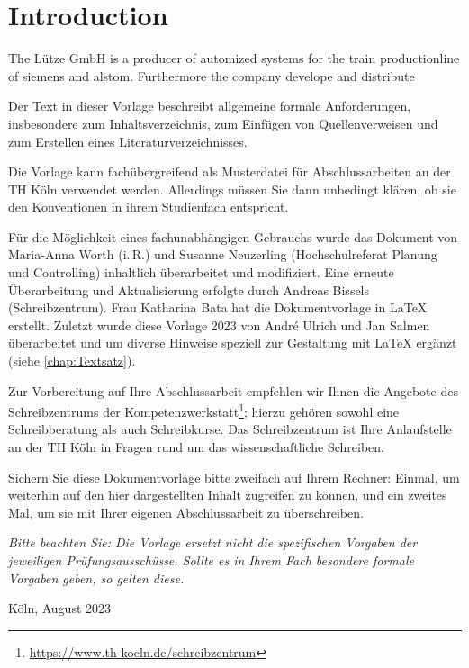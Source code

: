 \chapter{Introduction}
%
The Lütze GmbH is a producer of automized systems for the train productionline of siemens and alstom. Furthermore the company develope and distribute   
\par
Der Text in dieser Vorlage beschreibt allgemeine formale Anforderungen, insbesondere zum Inhaltsverzeichnis, zum Einfügen von Quellenverweisen und zum Erstellen eines Literaturverzeichnisses.
\par
Die Vorlage kann fachübergreifend als Musterdatei für Abschlussarbeiten an der TH Köln verwendet werden. Allerdings müssen Sie dann unbedingt klären, ob sie den Konventionen in ihrem Studienfach entspricht.
\par
Für die Möglichkeit eines fachunabhängigen Gebrauchs wurde das Dokument von Maria-Anna Worth (i.\,R.) und Susanne Neuzerling (Hochschulreferat Planung und Controlling) inhaltlich überarbeitet und modifiziert. Eine erneute Überarbeitung und Aktualisierung erfolgte durch Andreas Bissels (Schreibzentrum). Frau Katharina Bata hat die Dokumentvorlage in LaTeX erstellt. Zuletzt wurde diese Vorlage 2023 von André Ulrich und Jan Salmen überarbeitet und um diverse Hinweise speziell zur Gestaltung mit \LaTeX{} ergänzt (siehe \cref{chap:Textsatz}).
\par
Zur Vorbereitung auf Ihre Abschlussarbeit empfehlen wir Ihnen die Angebote des Schreibzentrums der Kompetenzwerkstatt\footnote{\href{https://www.th-koeln.de/schreibzentrum}{https://www.th-koeln.de/schreibzentrum}}; hierzu gehören sowohl eine Schreibberatung als auch Schreibkurse. Das Schreibzentrum ist Ihre Anlaufstelle an der TH Köln in Fragen rund um das wissenschaftliche Schreiben.
\par
Sichern Sie diese Dokumentvorlage bitte zweifach auf Ihrem Rechner: Einmal, um weiterhin auf den hier dargestellten Inhalt zugreifen zu können, und ein zweites Mal, um sie mit Ihrer eigenen Abschlussarbeit zu überschreiben.
\par
\emph{Bitte beachten Sie: Die Vorlage ersetzt nicht die spezifischen Vorgaben der jeweiligen Prüfungsausschüsse. Sollte es in Ihrem Fach besondere formale Vorgaben geben, so gelten diese.}\enlargethispage{\baselineskip}
%
\begin{flushright}
Köln, August 2023
\end{flushright}